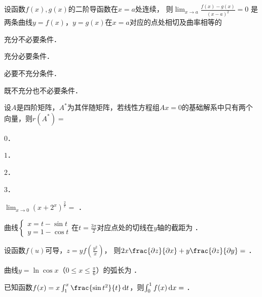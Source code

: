 \documentclass[plain,noanswer,medmath]{../../template/jnuexam}
\begin{document}
\begin{problem}
设函数$f(x),g(x)$的二阶导函数在$x = a$处连续，
则$\lim_{x \to a} \frac{f(x) - g(x)}{(x - a)^2} = 0$
是两条曲线$y = f(x)$，$y = g(x)$在$x = a$对应的点处相切及曲率相等的\pickout{}
\begin{abcd}
\item 充分不必要条件．
\item 充分必要条件．
\item 必要不充分条件．
\item 既不充分也不必要条件．
\end{abcd}
\end{problem}


\begin{problem}
设$A$是四阶矩阵，$A^*$为其伴随矩阵，若线性方程组$Ax = 0$的基础解系中只有两个向量，则$r(A^*) =$\pickout{}
\begin{abcd}
\item $0$．
\item $1$．
\item $2$．
\item $3$．
\end{abcd}
\end{problem}






\begin{problem}
$\lim_{x \to 0} \left(x + 2^x \right)^{\frac{2}{x}} =$ \fillin{}．
\end{problem}


\begin{problem}
曲线$\begin{cases}
  x = t - \sin t \\
  y = 1 - \cos t
\end{cases}$在$t = \frac{3\pi}{2}$对应点处的切线在$y$轴的截距为 \fillin{}．
\end{problem}


\begin{problem}
设函数$f(u)$可导，$z = yf\left(\frac{y^2}{x} \right)$，
则$2x\frac{\pdz}{\pdx} + y\frac{\pdz}{\pdy} =$ \fillin{}．
\end{problem}


\begin{problem}
曲线$y = \ln \cos x$（$0 \le x \le \frac{\pi}{6}$）的弧长为 \fillin{}．
\end{problem}


\begin{problem}
已知函数$f(x) = x\int_1^x \frac{\sin t^2}{t} \dt$，则$\int_0^1 f(x)\mathop{}\!\mathrm{d} x =$ \fillin{}．
\end{problem}
\end{document}
